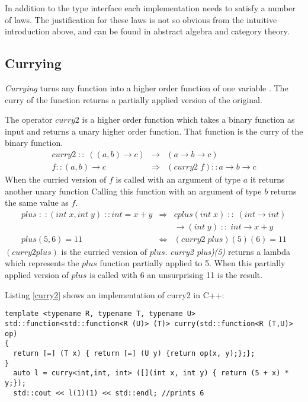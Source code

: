 \documentclass[12pt,fleqn]{article}
\begin{document}
In addition to the type interface each implementation needs to satisfy a number of laws.
The justification for these laws is not so obvious from the intuitive introduction above, and can be found in abstract algebra and category theory.

%
%
%
\subsection{Currying}
%
%
{\em Currying} turns any function into a higher order function of one variable \cite{field}.
The curry of the function returns a partially applied version of the original.

The operator $curry2$ is a higher order function which takes a binary function as input 
and returns a unary higher order function.
That function is the curry of the binary function.
\begin{eqnarray*}
curry2 \; :: \; ((a,b) \rightarrow c) &\rightarrow& (a \rightarrow b \rightarrow c) \\
f::(a,b) \rightarrow c &\Rightarrow&  (curry2\;f)::a \rightarrow b \rightarrow c 
\end{eqnarray*}
When the curried version of $f$ is called with an argument of type $a$ it returns another unary function 
Calling this function with an argument of type $b$ returns the same value as $f$.
\begin{eqnarray*}
plus\;:\;:(int \;x, int \;y) \;::int = x+y &\Rightarrow& cplus(int\; x) \;::\; (int \rightarrow int)  \\
                                                             & & \rightarrow (int \; y) \;::\; int \rightarrow x+y  \\
plus(5,6) = 11 &\Leftrightarrow&(curry2 \; plus)(5)(6) = 11
\end{eqnarray*}
$(curry2 plus)$ is the curried version of $plus$.
{\em curry2 plus)(5)} returns a lambda which represents the $plus$ function partially applied to 5. 
When this partially applied version of $plus$ is called with 6 an unsurprising 11 is the result.

Listing \ref{curry2} shows an implementation of curry2 in C++: 
\begin{minipage}{\linewidth}
\begin{lstlisting}[caption=curry for binary operators, label=curry2]
template <typename R, typename T, typename U>
std::function<std::function<R (U)> (T)> curry(std::function<R (T,U)> op)
{
  return [=] (T x) { return [=] (U y) {return op(x, y);};};
}
  auto l = curry<int,int, int> ([](int x, int y) { return (5 + x) * y;});
  std::cout << l(1)(1) << std::endl; //prints 6
\end{lstlisting}
\end{minipage}
%
%
%
\end{document}
